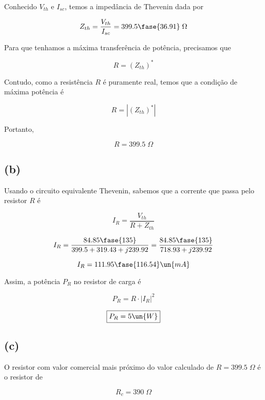 Conhecido $V_{th}$ e $I_{sc}$, temos a impedância de Thevenin dada por

\[ Z_{th} = \frac{V_{th}}{I_{sc}} = 399.5\fase{36.91} \;\Omega \]

Para que tenhamos a máxima transferência de potência, precisamos que

\[ R = (Z_{th})^* \]

Contudo, como a resistência $R$ é puramente real, temos que a condição de máxima potência é

\[ R = |(Z_{th})^*| \]

Portanto, 

\[ \boxed{R = 399.5 \;\Omega} \]

\subsection*{(b)}

Usando o circuito equivalente Thevenin, sabemos que a corrente que passa pelo resistor $R$ é

\[ I_R = \frac{V_{th}}{R + Z_{th}} \]

\[ I_R = \frac{84.85\fase{135}}{399.5 + 319.43 + j239.92} = \frac{84.85\fase{135}}{718.93 + j239.92} \]

\[ I_R = 111.95\fase{116.54} \un{mA} \]

Assim, a potência $P_R$ no resistor de carga é

\[ P_R = R \cdot |I_{R}|^2 \]

\[ \boxed{P_R = 5 \un{W}} \]

\subsection*{(c)}

O resistor com valor comercial mais próximo do valor calculado de $R = 399.5 \;\Omega$ é o resistor de

\[ \boxed{R_c = 390 \;\Omega} \]



